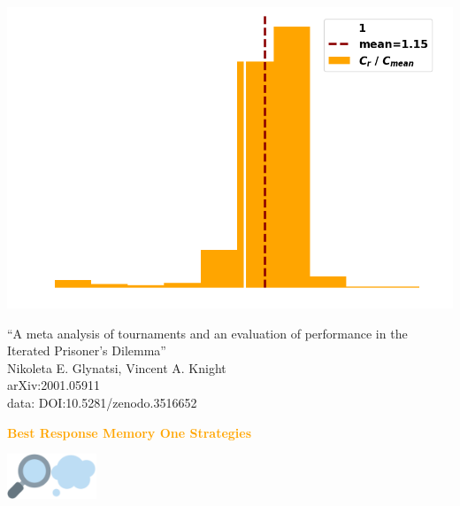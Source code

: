 \documentclass{beamer}
\begin{document}
\begin{frame}
    \begin{center}
        \includegraphics[width=.8\textwidth]{static/features.png}
    \end{center}
\end{frame}


\begin{frame}
    \begin{center}
        \large{``A meta analysis of tournaments and an evaluation of performance in the Iterated Prisoner's Dilemma''} \\ \vspace{.5cm}
        \footnotesize{Nikoleta E. Glynatsi, Vincent A. Knight} \\ \vspace{.5cm}
        \footnotesize{arXiv:2001.05911} \\ \vspace{.5cm}
        \footnotesize{data: DOI:10.5281/zenodo.3516652}
    \end{center}
\end{frame}

\begin{frame}
    \begin{center}
    \textcolor{orange}{\large{\textbf{Best Response Memory One Strategies}}} \vspace{1cm}

    \includegraphics[width=0.10\textwidth]{static/look.png}\hspace{2pt}\includegraphics[width=0.10\textwidth]{static/memone.png}
    \end{center}
\end{frame}
\end{document}
